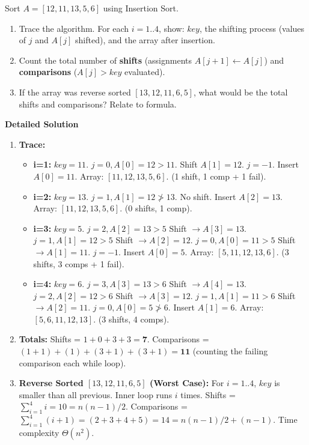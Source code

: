 \documentclass[11pt]{article}
\begin{document}
\begin{exoresolu}
    Sort $A = [12, 11, 13, 5, 6]$ using Insertion Sort.
    \begin{enumerate}
        \item Trace the algorithm. For each $i=1..4$, show: $key$, the shifting process (values of $j$ and $A[j]$ shifted), and the array after insertion.
        \item Count the total number of \textbf{shifts} (assignments $A[j+1] \leftarrow A[j]$) and \textbf{comparisons} ($A[j] > key$ evaluated).
        \item If the array was reverse sorted $[13, 12, 11, 6, 5]$, what would be the total shifts and comparisons? Relate to formula.
    \end{enumerate}
    \tcblower
    \textbf{Detailed Solution}
    \begin{enumerate}
        \item \textbf{Trace:}
            \begin{itemize}
                \item \textbf{i=1:} $key=11$. $j=0, A[0]=12 > 11$. Shift $A[1]=12$. $j=-1$. Insert $A[0]=11$. Array: $[11, 12, 13, 5, 6]$. (1 shift, 1 comp + 1 fail).
                \item \textbf{i=2:} $key=13$. $j=1, A[1]=12 \ngtr 13$. No shift. Insert $A[2]=13$. Array: $[11, 12, 13, 5, 6]$. (0 shifts, 1 comp).
                \item \textbf{i=3:} $key=5$. $j=2, A[2]=13>5$ Shift $\rightarrow A[3]=13$. $j=1, A[1]=12>5$ Shift $\rightarrow A[2]=12$. $j=0, A[0]=11>5$ Shift $\rightarrow A[1]=11$. $j=-1$. Insert $A[0]=5$. Array: $[5, 11, 12, 13, 6]$. (3 shifts, 3 comps + 1 fail).
                \item \textbf{i=4:} $key=6$. $j=3, A[3]=13>6$ Shift $\rightarrow A[4]=13$. $j=2, A[2]=12>6$ Shift $\rightarrow A[3]=12$. $j=1, A[1]=11>6$ Shift $\rightarrow A[2]=11$. $j=0, A[0]=5 \ngtr 6$. Insert $A[1]=6$. Array: $[5, 6, 11, 12, 13]$. (3 shifts, 4 comps).
            \end{itemize}
        \item \textbf{Totals:} Shifts = $1+0+3+3 = \mathbf{7}$. Comparisons = $(1+1)+(1)+(3+1)+(3+1) = \mathbf{11}$ (counting the failing comparison each while loop).
        \item \textbf{Reverse Sorted $[13, 12, 11, 6, 5]$ (Worst Case):}
            For $i=1..4$, $key$ is smaller than all previous. Inner loop runs $i$ times.
            Shifts = $\sum_{i=1}^{4} i = 10 = n(n-1)/2$.
            Comparisons = $\sum_{i=1}^{4} (i+1) = (2+3+4+5) = 14 = n(n-1)/2 + (n-1)$.
            Time complexity $\Theta(n^2)$.
    \end{enumerate}
\end{exoresolu}
\end{document}
